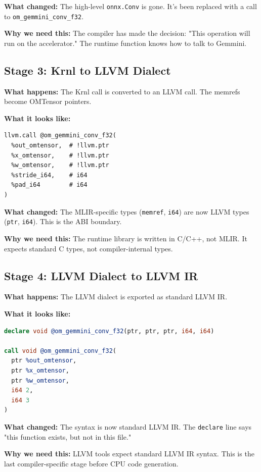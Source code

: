 \documentclass[12pt,a4paper]{article}
\begin{document}
\textbf{What changed:} The high-level \texttt{onnx.Conv} is gone. It's been replaced with a call to \texttt{om\_gemmini\_conv\_f32}.

\textbf{Why we need this:} The compiler has made the decision: "This operation will run on the accelerator." The runtime function knows how to talk to Gemmini.

\subsection{Stage 3: Krnl to LLVM Dialect}

\textbf{What happens:} The Krnl call is converted to an LLVM call. The memrefs become OMTensor pointers.

\textbf{What it looks like:}
\begin{lstlisting}
llvm.call @om_gemmini_conv_f32(
  %out_omtensor,  # !llvm.ptr
  %x_omtensor,    # !llvm.ptr
  %w_omtensor,    # !llvm.ptr
  %stride_i64,    # i64
  %pad_i64        # i64
)
\end{lstlisting}

\textbf{What changed:} The MLIR-specific types (\texttt{memref}, \texttt{i64}) are now LLVM types (\texttt{ptr}, \texttt{i64}). This is the ABI boundary.

\textbf{Why we need this:} The runtime library is written in C/C++, not MLIR. It expects standard C types, not compiler-internal types.

\subsection{Stage 4: LLVM Dialect to LLVM IR}

\textbf{What happens:} The LLVM dialect is exported as standard LLVM IR.

\textbf{What it looks like:}
\begin{lstlisting}[language=LLVM]
declare void @om_gemmini_conv_f32(ptr, ptr, ptr, i64, i64)

call void @om_gemmini_conv_f32(
  ptr %out_omtensor,
  ptr %x_omtensor,
  ptr %w_omtensor,
  i64 2,
  i64 3
)
\end{lstlisting}

\textbf{What changed:} The syntax is now standard LLVM IR. The \texttt{declare} line says "this function exists, but not in this file."

\textbf{Why we need this:} LLVM tools expect standard LLVM IR syntax. This is the last compiler-specific stage before CPU code generation.
\end{document}
